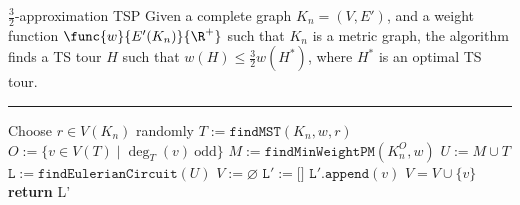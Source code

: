 \documentclass[a4paper, 12pt]{report}
\begin{document}
    \begin{framedalgo}{$\frac{3}{2}$-approximation TSP}
        Given a complete graph $K_n = (V, E')$, and a weight function $\func{w}{E'(K_n)}{\R^+}$ such that $K_n$ is a metric graph, the algorithm finds a TS tour $H$ such that $w(H) \le \frac{3}{2}w(H^*)$, where $H^*$ is an optimal TS tour. \\
        \hrule

        \quad
        \label{alg:3/2-approx_tsp}
        \begin{algorithmic}[1]
                \State Choose $r \in V(K_n)$ randomly
                \State $T := \texttt{findMST}(K_n, w, r)$ 
                \State $O := \{v \in V(T) \mid \deg_T(v) \ \mathrm{odd}\}$ 
                \State $M := \texttt{findMinWeightPM}(K_n^O, w)$ 
                \State $U := M \cup T$ 
                \State $\texttt L := \texttt{findEulerianCircuit}(U)$
                \State $V := \varnothing$
                \State $\texttt L' := \texttt{[]}$
                        \State $\texttt L'.\texttt{append}(v)$
                        \State $V = V \cup \{v\}$
                    \EndIf
                \EndFor
                \State \textbf{return} \ttt L' 
            \EndFunction
        \end{algorithmic}
    \end{framedalgo}
\end{document}
